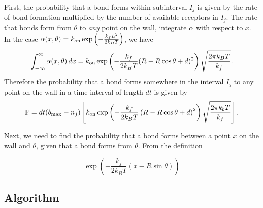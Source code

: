 \documentclass{article}
\newcommand{\tn}{\textnormal}
\newcommand{\on}{\textnormal{on}}
\begin{document}
First, the probability that a bond forms within subinterval $I_j$ is
given by the rate of bond formation multiplied by the number of
available receptors in $I_j$. The rate that bonds form from $\theta$
to \emph{any} point on the wall, integrate $\alpha$ with respect to
$x$. In the case $\alpha(x, \theta) = k_\tn{on} \exp\left(-\frac{k_f
    L^2}{2k_B T}\right)$, we have
\begin{equation}
  \label{eq:total_fm_rate}
  \int_{-\infty}^{\infty} \alpha(x, \theta)\, dx = k_\tn{on} \exp
  \left( -\frac{k_f}{2k_B T} (R - R \cos\theta + d)^2 \right)
  \sqrt{\frac{2 \pi k_B T}{k_f}}.
\end{equation}
Therefore the probability that a bond forms somewhere in the interval
$I_j$ to any point on the wall in a time interval of length $dt$ is
given by 
\begin{equation}
  \label{eq:1}
  \mathbb{P} = dt (b_\tn{max} - n_j) \left[ k_\on \exp \left( -
      \frac{k_f}{2 k_B T} \left( R - R\cos\theta + d \right)^2 \right)
    \sqrt{\frac{2\pi k_b T}{k_f}} \right].
\end{equation}

Next, we need to find the probability that a bond forms between a
point $x$ on the wall and $\theta$, given that a bond forms from
$\theta$. From the definition 

\begin{equation}
  \label{eq:2}
  \exp \left(-\frac{k_f}{2 k_B T}
    \left(x - R \sin{\theta} \right) \right)
\end{equation}

\subsection{Algorithm}
\label{sec:algorithm}
\end{document}
